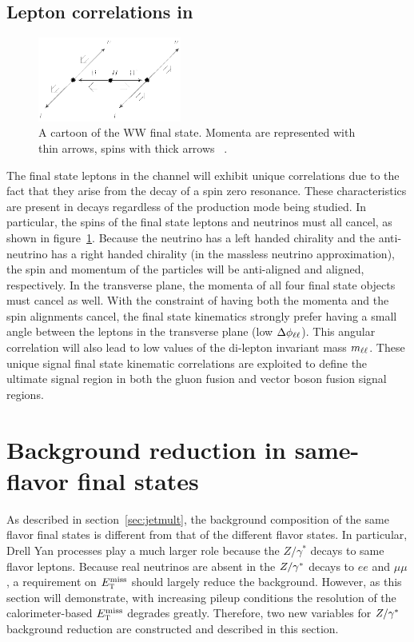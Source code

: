 \subsection{Lepton correlations in \HWWfull}
\label{sec:lepton_corr}
\begin{figure}[h!]
  \vspace{20pt}
  \centering
  \hspace*{-32pt}
  \includegraphics[width=0.42\textwidth]{figures/ww_spins}
  \caption{A cartoon of the WW final state. Momenta are represented with thin arrows, spins with thick arrows ~\cite{WW2015}.}
  \label{fig:HWWdiagram}
\end{figure}

The final state leptons in the \HWWfull channel will exhibit unique correlations due to the fact that they arise from the decay of a spin zero resonance. These characteristics are present in \HWWfull decays regardless of the production mode being studied. In particular, the spins of the final state leptons and neutrinos must all cancel, as shown in figure~\ref{fig:HWWdiagram}. Because the neutrino has a left handed
chirality and the anti-neutrino has a right handed chirality (in the massless neutrino approximation), the spin and momentum of the particles will be anti-aligned and aligned, respectively. In the transverse plane, the momenta of all four final state objects must cancel as well. With the constraint of having both the momenta and the spin alignments cancel, the final state kinematics strongly prefer having a small angle between the leptons in the transverse plane (low $\Delta\phi_{\ell\ell}$). This angular correlation will also lead to low values of the di-lepton invariant mass $m_{\ell\ell}$. These unique signal final state kinematic correlations are exploited to define the ultimate signal region in both the gluon fusion and vector boson fusion signal regions. 

\section{Background reduction in same-flavor final states}
\label{sec:sameflavor}
As described in section~\ref{sec:jetmult}, the background composition of the same flavor final states is different from that of the different flavor states. In particular, Drell Yan processes play a much larger role because the $Z/\gamma^{*}$ decays to same flavor leptons. Because real neutrinos are absent in the $Z/\gamma^{\ast}$ decays to $ee$ and $\mu\mu$, a requirement on $E_{\textrm{\footnotesize\sc t}}^{\rm miss}$ should largely reduce the background. However, as this section will demonstrate, with increasing pileup conditions the resolution of the calorimeter-based $E_{\textrm{\footnotesize\sc t}}^{\rm miss}$ degrades greatly. Therefore, two new variables for $Z/\gamma^{\ast}$ background reduction are constructed and described in this section.

